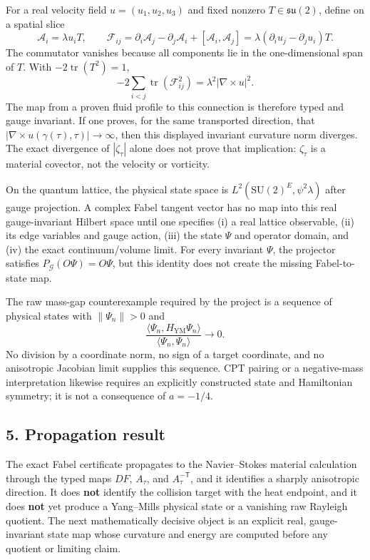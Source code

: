 For a real velocity field \(u=(u_1,u_2,u_3)\) and fixed nonzero
\(T\in\mathfrak{su}(2)\), define on a spatial slice \[
\mathcal A_i=\lambda u_iT,
\qquad
\mathcal F_{ij}=\partial_i\mathcal A_j-\partial_j\mathcal A_i+[\mathcal A_i,\mathcal A_j]
 =\lambda(\partial_i u_j-\partial_j u_i)T.
\] The commutator vanishes because all components lie in the
one-dimensional span of \(T\). With \(-2\operatorname{tr}(T^2)=1\), \[
-2\sum_{i<j}\operatorname{tr}(\mathcal F_{ij}^2)
 =\lambda^2|\nabla\times u|^2.
\] The map from a proven fluid profile to this connection is therefore
typed and gauge invariant. If one proves, for the same transported
direction, that \(|\nabla\times u(\gamma(\tau),\tau)|\to\infty\), then
this displayed invariant curvature norm diverges. The exact divergence
of \(|\zeta_\tau|\) alone does not prove that implication:
\(\zeta_\tau\) is a material covector, not the velocity or vorticity.

On the quantum lattice, the physical state space is
\(L^2(\mathrm{SU}(2)^E,\psi^2\lambda)\) after gauge projection. A
complex Fabel tangent vector has no map into this real gauge-invariant
Hilbert space until one specifies (i) a real lattice observable, (ii)
its edge variables and gauge action, (iii) the state \(\Psi\) and
operator domain, and (iv) the exact continuum/volume limit. For every
invariant \(\Psi\), the projector satisfies
\(P_{\mathcal G}(O\Psi)=O\Psi\), but this identity does not create the
missing Fabel-to-state map.

The raw mass-gap counterexample required by the project is a sequence of
physical states with \(\|\Psi_n\|>0\) and \[
\frac{\langle\Psi_n,H_{\mathrm{YM}}\Psi_n\rangle}{\langle\Psi_n,\Psi_n\rangle}\longrightarrow0.
\] No division by a coordinate norm, no sign of a target coordinate, and
no anisotropic Jacobian limit supplies this sequence. CPT pairing or a
negative-mass interpretation likewise requires an explicitly constructed
state and Hamiltonian symmetry; it is not a consequence of \(a=-1/4\).

\subsection{5. Propagation result}\label{fabel-jacobi-to-ym-coordinate-audit-md-propagation-result}

The exact Fabel certificate propagates to the Navier--Stokes material
calculation through the typed maps \(DF\), \(A_\tau\), and
\(A_\tau^{-\mathsf T}\), and it identifies a sharply anisotropic
direction. It does \textbf{not} identify the collision target with the
heat endpoint, and it does \textbf{not} yet produce a Yang--Mills
physical state or a vanishing raw Rayleigh quotient. The next
mathematically decisive object is an explicit real, gauge-invariant
state map whose curvature and energy are computed before any quotient or
limiting claim.
